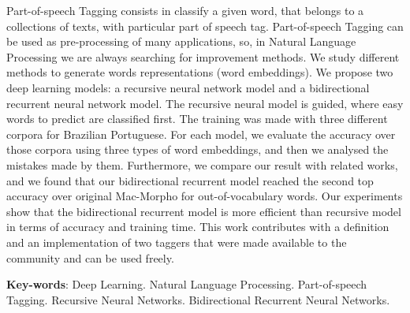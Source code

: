 \begin{resumo}[Abstract]
 
Part-of-speech Tagging consists in classify a given word, that belongs to a collections of texts, with particular part of speech tag. Part-of-speech Tagging can be used as pre-processing of many applications, so, in Natural Language Processing we are always searching for improvement methods. We study different methods to generate words representations (word embeddings). We propose two deep learning models: a recursive neural network model and a bidirectional recurrent neural network model. The recursive neural model is guided, where easy words to predict are classified first. The training was made with three different corpora for Brazilian Portuguese. For each model, we evaluate the accuracy over those corpora using three types of word embeddings, and then we analysed the mistakes made by them. Furthermore, we compare our result with related works, and we found that our bidirectional recurrent model reached the second top accuracy over original Mac-Morpho for out-of-vocabulary words. Our experiments show that the bidirectional recurrent model is more efficient than recursive model in terms of accuracy and training time. This work contributes with a definition and an implementation of two taggers that were made available to the community and can be used freely.

 \vspace{\onelineskip}
 
 \noindent 
 \textbf{Key-words}: Deep Learning. Natural Language Processing. Part-of-speech Tagging. Recursive Neural Networks. Bidirectional Recurrent Neural Networks.
\end{resumo}

